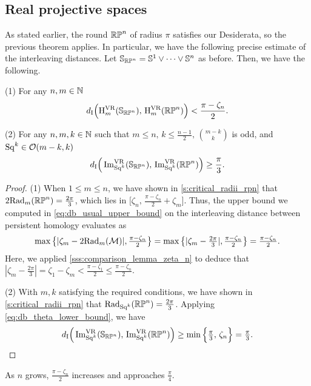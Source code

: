 \subsection{Real projective spaces}\label{ss:distance_estimate_rpn}

As stated earlier, the round \(\mathbb{RP}^n\) of radius \(\pi\) satisfies our Desiderata, so the previous theorem applies.
In particular, we have the following precise estimate of the interleaving distances.
Let \(\mathbb{S}_{\mathbb{RP}^n} = \mathbb{S}^1 \vee \dots \vee \mathbb{S}^n\) as before.
Then, we have the following.

\medskip\corollary
(1) For any \(n,m \in \mathbb{N}\)
\[
d_{\mathrm{I}}\Big(\mathrm{H}^{\mathrm{VR}}_m(\mathbb{S}_{\mathbb{RP}^n}),\, \mathrm{H}^{\mathrm{VR}}_m(\mathbb{RP}^n)\Big) < \frac{\pi - \zeta_n}{2}.
\]

\noindent (2) For any \(n,m,k \in \mathbb{N}\) such that $m \leq n,\, k \leq \tfrac{n-1}{2},\, \binom{m-k}{k}$ is odd, and $\mathrm{Sq}^k\in \mathcal{O}(m-k, k)$
\[
d_{\mathrm{I}}\Big(\operatorname{Im}_{\mathrm{Sq}^k}^{\mathrm{VR}}(\mathbb{S}_{\mathbb{RP}^n}),\, \operatorname{Im}_{\mathrm{Sq}^k}^{\mathrm{VR}}(\mathbb{RP}^n)\Big) \geq \frac{\pi}{3}.
\]

\begin{proof}
    (1) %
    When $1 \leq m \leq n$, we have shown in \cref{s:critical_radii_rpn} that
    $2\mathrm{Rad}_{m}(\mathbb{RP}^n) = \tfrac{2\pi}{3}$, which lies in $\big[\zeta_n,\, \tfrac{\pi - \zeta_n}{2}+\zeta_m\big]$.
    Thus, the upper bound we computed in \cref{eq:db_usual_upper_bound} on the interleaving distance between persistent homology evaluates as
    \[\max\big\{|\zeta_m  - 2\mathrm{Rad}_{m}(\mathcal{M}) |, \tfrac{\pi - \zeta_n}{2}\big\} = 
    \max \big\{ |\zeta_m  - \tfrac{2\pi}{3} |, \tfrac{\pi - \zeta_n}{2} \big\}
    = \tfrac{\pi - \zeta_n}{2}.
    \]
    Here, we applied \cref{sss:comparison_lemma_zeta_n} to deduce that $|\zeta_m  - \tfrac{2\pi}{3} | = \zeta_1 - \zeta_m < \tfrac{\pi - \zeta_1}{2} \leq \tfrac{\pi - \zeta_n}{2}$.
 
    (2) With $m,k$ satisfying the required conditions, we have shown in \cref{s:critical_radii_rpn} that
	$\mathrm{Rad}_{\mathrm{Sq}^k}(\mathbb{RP}^n) = \tfrac{2\pi}{3}$.
    Applying \cref{eq:db_theta_lower_bound}, we have
	\[d_{\mathrm{I}}\Big(\operatorname{Im}_{\mathrm{Sq}^k}^{\mathrm{VR}}(\mathbb{S}_{\mathbb{RP}^n}),\, \operatorname{Im}_{\mathrm{Sq}^k}^{\mathrm{VR}}(\mathbb{RP}^n)\Big)
	\geq \min\Big\{\tfrac{\pi}{3},\, \zeta_n\Big\}
	= \tfrac{\pi}{3}.\qedhere
    \]
\end{proof}

As \(n\) grows, \(\tfrac{\pi - \zeta_n}{2}\) increases and approaches \(\tfrac{\pi}{4}\).
